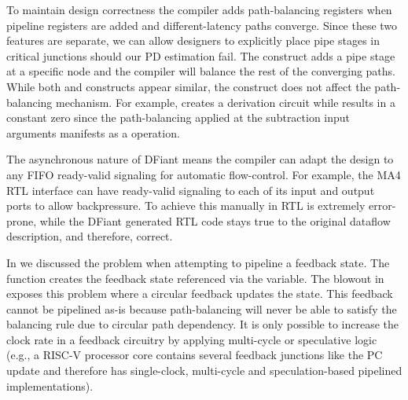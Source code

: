 To maintain design correctness the compiler adds path-balancing registers when pipeline registers are added and different-latency paths converge. Since these two features are separate, we can allow designers to explicitly place pipe stages in critical junctions should our PD estimation fail. The  construct adds a pipe stage at a specific node and the compiler will balance the rest of the converging paths. While both  and  constructs appear similar, the  construct does not affect the path-balancing mechanism. For example,  creates a derivation circuit while  results in a constant zero since the path-balancing applied at the subtraction input arguments manifests as a  operation.

The asynchronous nature of DFiant means the compiler can adapt the design to any FIFO ready-valid signaling for automatic flow-control. For example, the MA4 RTL interface can have ready-valid signaling to each of its input and output ports to allow backpressure. To achieve this manually in RTL is extremely error-prone, while the DFiant generated RTL code stays true to the original dataflow description, and therefore, correct.
 
In  we discussed the problem when attempting to pipeline a feedback state. The  function creates the feedback state referenced via the  variable. The  blowout in  exposes this problem where a circular feedback updates the  state. This feedback cannot be pipelined as-is because path-balancing will never be able to satisfy the balancing rule due to circular path dependency. It is only possible to increase the clock rate in a feedback circuitry by applying multi-cycle or speculative logic (e.g., a RISC-V processor core contains several feedback junctions like the PC update and therefore has single-clock, multi-cycle and speculation-based pipelined implementations). 




